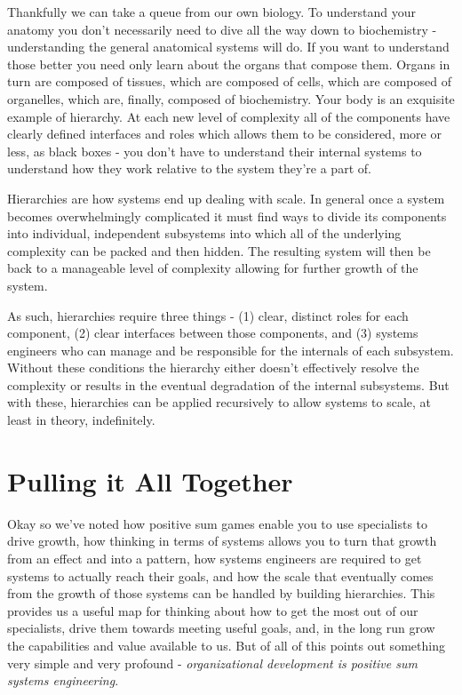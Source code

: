 \documentclass[11pt,a5paper]{book}
\begin{document}
Thankfully we can take a queue from our own biology. To understand your anatomy you don't necessarily need to dive all the way down to biochemistry - understanding the general anatomical systems will do. If you want to understand those better you need only learn about the organs that compose them. Organs in turn are composed of tissues, which are composed of cells, which are composed of organelles, which are, finally, composed of biochemistry. Your body is an exquisite example of hierarchy. At each new level of complexity all of the components have clearly defined interfaces and roles which allows them to be considered, more or less, as black boxes - you don't have to understand their internal systems to understand how they work relative to the system they're a part of. 
\newline

Hierarchies are how systems end up dealing with scale. In general once a system becomes overwhelmingly complicated it must find ways to divide its components into individual, independent subsystems into which all of the underlying complexity can be packed and then hidden. The resulting system will then be back to a manageable level of complexity allowing for further growth of the system. 
\newline

As such, hierarchies require three things - (1) clear, distinct roles for each component, (2) clear interfaces between those components, and (3) systems engineers who can manage and be responsible for the internals of each subsystem. Without these conditions the hierarchy either doesn't effectively resolve the complexity or results in the eventual degradation of the internal subsystems. But with these, hierarchies can be applied recursively to allow systems to scale, at least in theory, indefinitely. 

\section{Pulling it All Together}
Okay so we've noted how positive sum games enable you to use specialists to drive growth, how thinking in terms of systems allows you to turn that growth from an effect and into a pattern, how systems engineers are required to get systems to actually reach their goals, and how the scale that eventually comes from the growth of those systems can be handled by building hierarchies. This provides us a useful map for thinking about how to get the most out of our specialists, drive them towards meeting useful goals, and, in the long run grow the capabilities and value available to us. But of all of this points out something very simple and very profound - \textit{organizational development is positive sum systems engineering}. 
\newline
\end{document}
